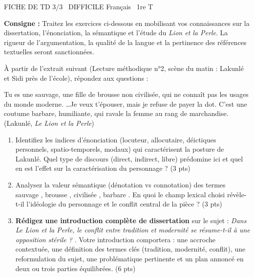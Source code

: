 \documentclass[11pt]{article}
\begin{document}
\begin{tcolorbox}[enhanced,colback=popink,colframe=popink,arc=10pt,boxrule=0pt,left=12pt,right=12pt,top=9pt,bottom=9pt]
{\color{white}\popxbold\small FICHE DE TD 3/3 \textbullet\ DIFFICILE \hfill Français \textbullet\ 1re T\par}
\end{tcolorbox}
\vspace{4pt}
\noindent \textbf{Consigne :} Traitez les exercices ci-dessous en mobilisant vos connaissances sur la dissertation, l'énonciation, la sémantique et l'étude du \textit{Lion et la Perle}. La rigueur de l'argumentation, la qualité de la langue et la pertinence des références textuelles seront sanctionnées.

\begin{exercice}
À partir de l'extrait suivant (Lecture méthodique n°2, scène du matin : Lakunlé et Sidi près de l'école), répondez aux questions :

\og Tu es une sauvage, une fille de brousse non civilisée, qui ne connaît pas les usages du monde moderne. \dots Je veux t'épouser, mais je refuse de payer la dot. C'est une coutume barbare, humiliante, qui ravale la femme au rang de marchandise. \fg{} (Lakunlé, \textit{Le Lion et la Perle})

\begin{enumerate}
    \item Identifiez les indices d'énonciation (locuteur, allocutaire, déictiques personnels, spatio-temporels, modaux) qui caractérisent la posture de Lakunlé. Quel type de discours (direct, indirect, libre) prédomine ici et quel en est l'effet sur la caractérisation du personnage ? (3 pts)
    \item Analysez la valeur sémantique (dénotation vs connotation) des termes \og sauvage \fg{}, \og brousse \fg{}, \og civilisée \fg{}, \og barbare \fg{}. En quoi le champ lexical choisi révèle-t-il l'idéologie du personnage et le conflit central de la pièce ? (3 pts)
    \item \textbf{Rédigez une introduction complète de dissertation} sur le sujet : \og \textit{Dans Le Lion et la Perle, le conflit entre tradition et modernité se résume-t-il à une opposition stérile ?} \fg{}. Votre introduction comportera : une accroche contextuée, une définition des termes clés (tradition, modernité, conflit), une reformulation du sujet, une problématique pertinente et un plan annoncé en deux ou trois parties équilibrées. (6 pts)
\end{enumerate}
\end{exercice}
\end{document}
